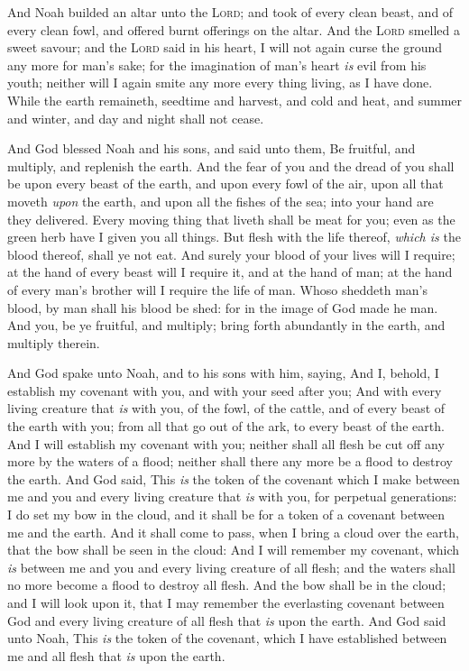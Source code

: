 \documentclass[11pt,letterpaper,oneside]{memoir}
\begin{document}
And Noah builded an altar unto the \textsc{Lord}; and took of every clean
beast, and of every clean fowl, and offered burnt offerings on the
altar. And the \textsc{Lord} smelled a sweet savour; and the \textsc{Lord}
said in his heart, I will not again curse the ground any more for man's
sake; for the imagination of man's heart \emph{is} evil from his youth;
neither will I again smite any more every thing living, as I have done.
While the earth remaineth, seedtime and harvest, and cold and heat, and
summer and winter, and day and night shall not cease.

And God blessed Noah and his sons, and said unto them, Be fruitful, and
multiply, and replenish the earth. And the fear of you and the dread of
you shall be upon every beast of the earth, and upon every fowl of the
air, upon all that moveth \emph{upon} the earth, and upon all the fishes
of the sea; into your hand are they delivered. Every moving thing that
liveth shall be meat for you; even as the green herb have I given you
all things. But flesh with the life thereof, \emph{which is} the blood
thereof, shall ye not eat. And surely your blood of your lives will I
require; at the hand of every beast will I require it, and at the hand
of man; at the hand of every man's brother will I require the life of
man. Whoso sheddeth man's blood, by man shall his blood be shed: for in
the image of God made he man. And you, be ye fruitful, and multiply;
bring forth abundantly in the earth, and multiply therein.

And God spake unto Noah, and to his sons with him, saying, And I,
behold, I establish my covenant with you, and with your seed after you;
And with every living creature that \emph{is} with you, of the fowl, of
the cattle, and of every beast of the earth with you; from all that go
out of the ark, to every beast of the earth. And I will establish my
covenant with you; neither shall all flesh be cut off any more by the
waters of a flood; neither shall there any more be a flood to destroy
the earth. And God said, This \emph{is} the token of the covenant which
I make between me and you and every living creature that \emph{is} with
you, for perpetual generations: I do set my bow in the cloud, and it
shall be for a token of a covenant between me and the earth. And it
shall come to pass, when I bring a cloud over the earth, that the bow
shall be seen in the cloud: And I will remember my covenant, which
\emph{is} between me and you and every living creature of all flesh; and
the waters shall no more become a flood to destroy all flesh. And the
bow shall be in the cloud; and I will look upon it, that I may remember
the everlasting covenant between God and every living creature of all
flesh that \emph{is} upon the earth. And God said unto Noah, This
\emph{is} the token of the covenant, which I have established between me
and all flesh that \emph{is} upon the earth.
\end{document}
